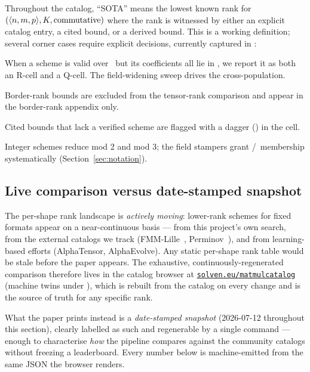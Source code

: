 Throughout the catalog, ``SOTA'' means the lowest known rank for
\((\langle n, m, p \rangle, K, \text{commutative})\) where the rank is
witnessed by either an explicit catalog entry, a cited bound, or a
derived bound. This is a working definition; several corner cases
require explicit decisions, currently captured in
:
\begin{description}[itemsep=2pt]
  \item[Mixed-field.] When a scheme is valid over \Reals\ but its
    coefficients all lie in \Integers, we report it as both an
    R-cell and a Q-cell. The field-widening sweep drives the
    cross-population.
  \item[Border vs exact.] Border-rank bounds are excluded from the
    tensor-rank comparison and appear in the border-rank appendix only.
  \item[Partially verified.] Cited bounds that lack a verified
    scheme are flagged with a dagger (\dag) in the cell.
  \item[$\Ftwo$/$\Fthree$.] Integer schemes reduce mod 2 and mod 3;
    the field stampers grant \Ftwo/\Fthree\ membership systematically
    (Section~\ref{sec:notation}).
\end{description}

\subsection{Live comparison versus date-stamped snapshot}
\label{ssec:no-static-ranks}

The per-shape rank landscape is \emph{actively moving}: lower-rank
schemes for fixed formats appear on a near-continuous basis --- from
this project's own search, from the external catalogs we track
(FMM-Lille~\cite{fmmlille}, Perminov~\cite{perminov}), and from
learning-based efforts (AlphaTensor, AlphaEvolve). Any static
per-shape rank table would be stale before the paper appears. The
exhaustive, continuously-regenerated comparison therefore lives in the
catalog browser at
\href{https://www.solven.eu/matmulcatalog/}{\texttt{solven.eu/matmulcatalog}}
(machine twins under ), which is rebuilt from
the catalog on every change and is the source of truth for any
specific rank.

What the paper prints instead is a \emph{date-stamped snapshot}
(2026-07-12 throughout this section), clearly labelled as such and
regenerable by a single command --- enough to characterise \emph{how}
the pipeline compares against the community catalogs without freezing
a leaderboard. Every number below is machine-emitted from the same
JSON the browser renders.

